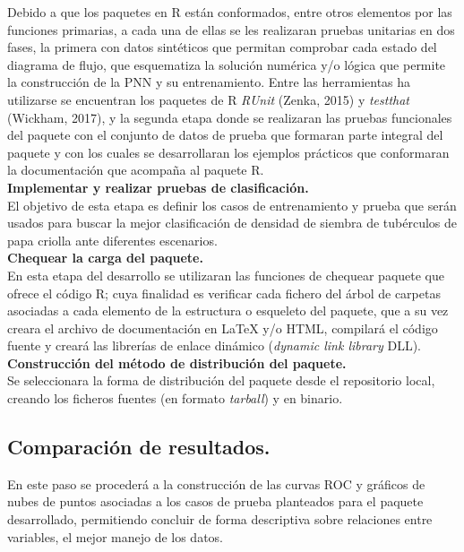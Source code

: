Debido a que los paquetes en R están conformados, entre otros elementos por las funciones primarias, a cada una de ellas se les realizaran pruebas unitarias en dos fases, la primera con datos sintéticos que permitan comprobar cada estado del diagrama de flujo, que esquematiza la solución numérica y/o lógica que permite la construcción de la PNN y su entrenamiento. Entre las herramientas ha utilizarse se encuentran los paquetes de R \emph{RUnit} (Zenka, 2015) y \emph{testthat} (Wickham, 2017), y la segunda etapa donde se realizaran las pruebas funcionales del paquete con el conjunto de datos de prueba que formaran parte integral del paquete y con los cuales se desarrollaran los ejemplos prácticos que conformaran la documentación que acompaña al paquete R.\\

\noindent
\textbf{Implementar y realizar pruebas de clasificación.}\\

El objetivo de esta etapa es definir los casos de entrenamiento y prueba que serán usados para buscar la mejor clasificación de densidad de siembra de tubérculos de papa criolla  ante diferentes escenarios.\\

 
  
\noindent
\textbf{Chequear la carga del paquete.}\\

En esta etapa del desarrollo se utilizaran las funciones de chequear paquete que ofrece el código R; cuya finalidad es verificar cada fichero del árbol de carpetas asociadas a cada elemento de la estructura o esqueleto del paquete, que a su vez creara el archivo de documentación en LaTeX y/o HTML, compilará el código fuente y creará las librerías de enlace dinámico (\emph{dynamic link library} DLL).\\  

\noindent
\textbf{Construcci\'on del m\'etodo de distribuci\'on del paquete.}\\

Se seleccionara la forma de distribución del paquete desde el repositorio local, creando los ficheros fuentes  (en formato  \emph{tarball})  y en binario.\\


\subsection{Comparación de resultados.}

En este paso se procederá a la construcción de las curvas ROC y gráficos de nubes de puntos asociadas a los casos de prueba planteados para el paquete desarrollado, permitiendo concluir de forma descriptiva sobre  relaciones entre variables, el mejor manejo de los datos.\\